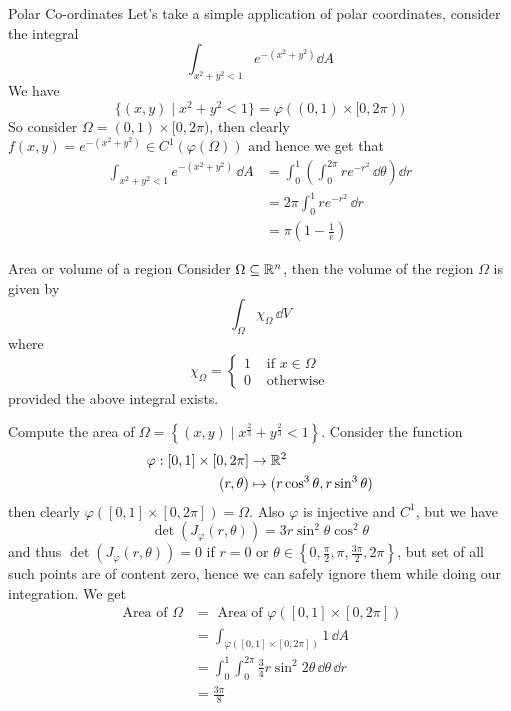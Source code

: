 \documentclass[../Analysis-3.tex]{subfiles}
\begin{document}
\begin{Eg}{Polar Co-ordinates}{}
  Let's take a simple application of polar coordinates, consider the integral
  \[
    \int_{x^2 + y^2 < 1} e^{-(x^2+y^2)} \dd A
  \]
  We have
  \[
    \{ (x,y) \mid x^2 + y^2 < 1 \} = \varphi( (0,1) \times [0,2\pi))
  \]
  So consider $\Omega = (0,1) \times [0,2\pi)$, then clearly $f(x,y) = e^{-(x^2+y^2)} \in C^1(\varphi(\Omega))$ and hence we get that
  \begin{align*}
    \int_{x^2+y^2 < 1} e^{-(x^2+y^2)} \, \dd A & = \int_0^1 \left( \int_0^{2\pi} re^{-r^2} \, \dd \theta \right) \dd r \\
                                               & = 2\pi \int_0^1 r e^{-r^2} \, \dd r                                   \\
                                               & = \pi \left( 1 - \frac{1}{e}\right)
  \end{align*}
\end{Eg}

\begin{Def}{Area or volume of a region}{}
  Consider $\Omega \subseteq \mathbb{R}^n$, then the volume of the region $\Omega$ is given by
  \[
    \int_{\Omega} \chi_{\Omega} \, \dd V
  \]
  where
  \[
    \chi_{\Omega} = \begin{cases}
      1 & \mbox{ if } x \in \Omega \\
      0 & \mbox{ otherwise}
    \end{cases}
  \]
  provided the above integral exists.
\end{Def}

\begin{Eg}{}{}
  Compute the area of $\Omega = \left\{ (x,y) \mid x^{\frac{2}{3}} + y^{\frac{2}{3}} < 1 \right\}$. Consider the function
  \begin{align*}
    \varphi : [0,1] \times [0,2\pi] & \to \mathbb{R}^2                                 \\
    (r,\theta)                      & \mapsto ( r\cos^3\theta, r\sin^3\theta )
  \end{align*}
  then clearly $\varphi([0,1] \times [0,2\pi]) = \Omega$. Also $\varphi$ is injective and $C^1$, but we have
  \[
    \det(J_{\varphi}(r,\theta)) = 3r \sin^2\theta \cos^2\theta
  \]
  and thus $\det(J_{\varphi}(r,\theta)) = 0$ if $r = 0$ or $\theta \in \left\{ 0, \frac{\pi}{2}, \pi, \frac{3\pi}{2}, 2\pi \right\}$, but set of all such points are of content zero, hence we can safely ignore them while doing our integration. We get
  \begin{align*}
    \mbox{ Area of } \Omega & = \mbox{ Area of } \varphi \left( [0,1] \times [0,2\pi] \right)              \\
                            & = \int_{\varphi([0,1] \times [0,2\pi])} 1 \, \dd A                           \\
                            & = \int_0^1 \int_0^{2\pi} \frac{3}{4} r \sin^2 2\theta \, \dd \theta \, \dd r \\
                            & = \frac{3\pi}{8}
  \end{align*}
\end{Eg}
\end{document}
